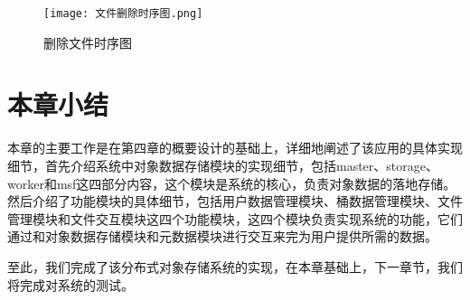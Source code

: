 \begin{figure}
  \centering
  \texttt{[image: 文件删除时序图.png]}
  \caption{删除文件时序图}
\end{figure}

\section{本章小结}%
本章的主要工作是在第四章的概要设计的基础上，详细地阐述了该应用的具体实现细节，首先介绍系统中对象数据存储模块的实现细节，包括master、storage、worker和msf这四部分内容，这个模块是系统的核心，负责对象数据的落地存储。然后介绍了功能模块的具体细节，包括用户数据管理模块、桶数据管理模块、文件管理模块和文件交互模块这四个功能模块，这四个模块负责实现系统的功能，它们通过和对象数据存储模块和元数据模块进行交互来完为用户提供所需的数据。

至此，我们完成了该分布式对象存储系统的实现，在本章基础上，下一章节，我们将完成对系统的测试。 

